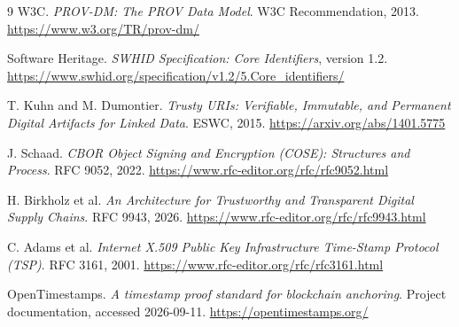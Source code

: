 \documentclass[11pt]{article}
\begin{document}
\begin{thebibliography}{9}
W3C. \emph{PROV-DM: The PROV Data Model}. W3C Recommendation, 2013. \url{https://www.w3.org/TR/prov-dm/}

Software Heritage. \emph{SWHID Specification: Core Identifiers}, version 1.2. \url{https://www.swhid.org/specification/v1.2/5.Core_identifiers/}

T. Kuhn and M. Dumontier. \emph{Trusty URIs: Verifiable, Immutable, and Permanent Digital Artifacts for Linked Data}. ESWC, 2015. \url{https://arxiv.org/abs/1401.5775}

J. Schaad. \emph{CBOR Object Signing and Encryption (COSE): Structures and Process}. RFC 9052, 2022. \url{https://www.rfc-editor.org/rfc/rfc9052.html}

H. Birkholz et al. \emph{An Architecture for Trustworthy and Transparent Digital Supply Chains}. RFC 9943, 2026. \url{https://www.rfc-editor.org/rfc/rfc9943.html}

C. Adams et al. \emph{Internet X.509 Public Key Infrastructure Time-Stamp Protocol (TSP)}. RFC 3161, 2001. \url{https://www.rfc-editor.org/rfc/rfc3161.html}

OpenTimestamps. \emph{A timestamp proof standard for blockchain anchoring}.
Project documentation, accessed 2026-09-11. \url{https://opentimestamps.org/}
\end{thebibliography}
\end{document}

